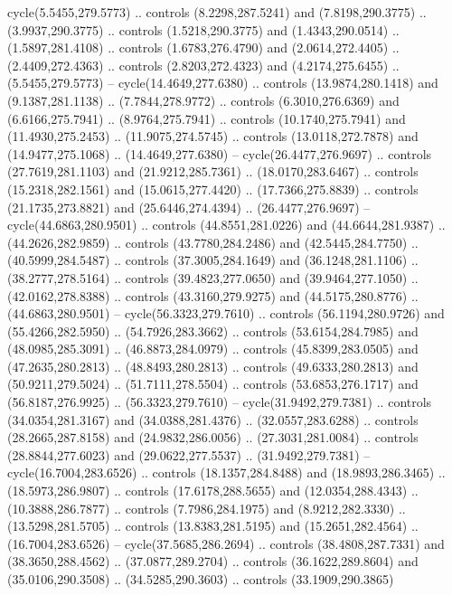 \begin{scope}[cm={{1.25,0.0,0.0,-1.25,(0.0,743.43331)}}]
    cycle(5.5455,279.5773) .. controls (8.2298,287.5241) and (7.8198,290.3775) ..
    (3.9937,290.3775) .. controls (1.5218,290.3775) and (1.4343,290.0514) ..
    (1.5897,281.4108) .. controls (1.6783,276.4790) and (2.0614,272.4405) ..
    (2.4409,272.4363) .. controls (2.8203,272.4323) and (4.2174,275.6455) ..
    (5.5455,279.5773) -- cycle(14.4649,277.6380) .. controls (13.9874,280.1418)
    and (9.1387,281.1138) .. (7.7844,278.9772) .. controls (6.3010,276.6369) and
    (6.6166,275.7941) .. (8.9764,275.7941) .. controls (10.1740,275.7941) and
    (11.4930,275.2453) .. (11.9075,274.5745) .. controls (13.0118,272.7878) and
    (14.9477,275.1068) .. (14.4649,277.6380) -- cycle(26.4477,276.9697) ..
    controls (27.7619,281.1103) and (21.9212,285.7361) .. (18.0170,283.6467) ..
    controls (15.2318,282.1561) and (15.0615,277.4420) .. (17.7366,275.8839) ..
    controls (21.1735,273.8821) and (25.6446,274.4394) .. (26.4477,276.9697) --
    cycle(44.6863,280.9501) .. controls (44.8551,281.0226) and (44.6644,281.9387)
    .. (44.2626,282.9859) .. controls (43.7780,284.2486) and (42.5445,284.7750) ..
    (40.5999,284.5487) .. controls (37.3005,284.1649) and (36.1248,281.1106) ..
    (38.2777,278.5164) .. controls (39.4823,277.0650) and (39.9464,277.1050) ..
    (42.0162,278.8388) .. controls (43.3160,279.9275) and (44.5175,280.8776) ..
    (44.6863,280.9501) -- cycle(56.3323,279.7610) .. controls (56.1194,280.9726)
    and (55.4266,282.5950) .. (54.7926,283.3662) .. controls (53.6154,284.7985)
    and (48.0985,285.3091) .. (46.8873,284.0979) .. controls (45.8399,283.0505)
    and (47.2635,280.2813) .. (48.8493,280.2813) .. controls (49.6333,280.2813)
    and (50.9211,279.5024) .. (51.7111,278.5504) .. controls (53.6853,276.1717)
    and (56.8187,276.9925) .. (56.3323,279.7610) -- cycle(31.9492,279.7381) ..
    controls (34.0354,281.3167) and (34.0388,281.4376) .. (32.0557,283.6288) ..
    controls (28.2665,287.8158) and (24.9832,286.0056) .. (27.3031,281.0084) ..
    controls (28.8844,277.6023) and (29.0622,277.5537) .. (31.9492,279.7381) --
    cycle(16.7004,283.6526) .. controls (18.1357,284.8488) and (18.9893,286.3465)
    .. (18.5973,286.9807) .. controls (17.6178,288.5655) and (12.0354,288.4343) ..
    (10.3888,286.7877) .. controls (7.7986,284.1975) and (8.9212,282.3330) ..
    (13.5298,281.5705) .. controls (13.8383,281.5195) and (15.2651,282.4564) ..
    (16.7004,283.6526) -- cycle(37.5685,286.2694) .. controls (38.4808,287.7331)
    and (38.3650,288.4562) .. (37.0877,289.2704) .. controls (36.1622,289.8604)
    and (35.0106,290.3508) .. (34.5285,290.3603) .. controls (33.1909,290.3865)

\end{scope}
